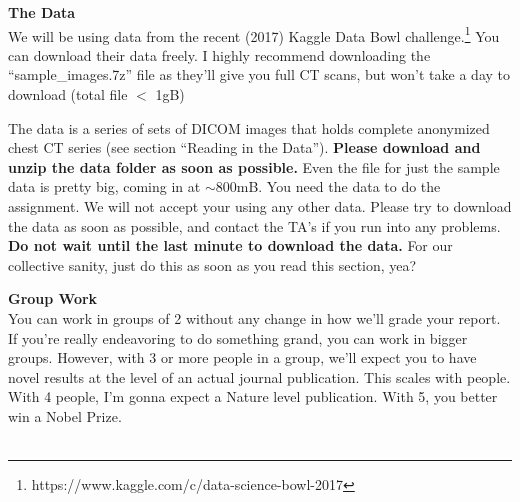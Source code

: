 \documentclass[10pt]{article}
\begin{document}
\noindent \Large \textbf{The Data} \normalsize \\
\noindent\makebox[\linewidth]{\rule{\textwidth}{0.4pt}}
We will be using data from the recent (2017) Kaggle Data Bowl challenge.\footnote{https://www.kaggle.com/c/data-science-bowl-2017}  You can download their data freely.  I highly recommend downloading the ``sample\_images.7z'' file as they'll give you full CT scans, but won't take a day to download (total file $<$ 1gB)

The data is a series of sets of DICOM images that holds complete anonymized chest CT series (see section ``Reading in the Data'').
\textbf{Please download and unzip the data folder as soon as possible.}  Even the file for just the sample data is pretty big, coming in at $\sim$800mB.  You need the data to do the assignment.  We will not accept your using any other data.  Please try to download the data as soon as possible, and contact the TA's if you run into any problems.  \textbf{Do not wait until the last minute to download the data.}  For our collective sanity, just do this as soon as you read this section, yea?



















































\clearpage
\noindent \Large \textbf{Group Work} \normalsize \\
\noindent\makebox[\linewidth]{\rule{\textwidth}{0.4pt}}
You can work in groups of 2 without any change in how we'll grade your report.  If you're really endeavoring to do something grand, you can work in bigger groups.  However, with 3 or more people in a group, we'll expect you to have novel results at the level of an actual journal publication.  This scales with people.  With 4 people, I'm gonna expect a Nature level publication.  With 5, you better win a Nobel Prize.\\
\ \\
\end{document}
